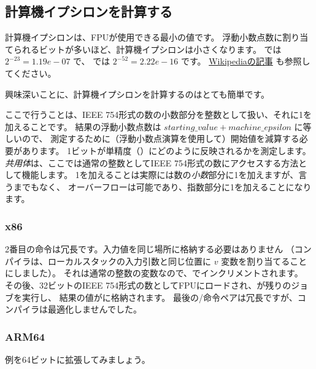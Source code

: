 ﻿\subsection{計算機イプシロンを計算する}

計算機イプシロンは、\ac{FPU}が使用できる最小の値です。 
浮動小数点数に割り当てられるビットが多いほど、計算機イプシロンは小さくなります。
\Tfloat では $2^{-23} = 1.19e-07$ で、 \Tdouble では $2^{-52} = 2.22e-16$ です。
\href{http://link.yurichev.com/17367}{Wikipediaの記事} も参照してください。

興味深いことに、計算機イプシロンを計算するのはとても簡単です。



ここで行うことは、IEEE 754形式の数の小数部分を整数として扱い、それに1を加えることです。
結果の浮動小数点数は $starting\_value+machine\_epsilon$ に等しいので、
測定するために（浮動小数点演算を使用して）開始値を減算する必要があります。
1ビットが単精度（\Tfloat）にどのように反映されるかを測定します。
\emph{共用体}は、ここでは通常の整数としてIEEE 754形式の数にアクセスする方法として機能します。 
1を加えることは実際には数の\emph{小数}部分に1を加えますが、言うまでもなく、
オーバーフローは可能であり、指数部分に1を加えることになります。

\subsubsection{x86}



2番目の命令は冗長です。入力値を同じ場所に格納する必要はありません
（コンパイラは、ローカルスタックの入力引数と同じ位置に $v$ 変数を割り当てることにしました）。
それは通常の整数の変数なので、でインクリメントされます。 
その後、32ビットのIEEE 754形式の数としてFPUにロードされ、が残りのジョブを実行し、
結果の値がに格納されます。 
最後の/命令ペアは冗長ですが、コンパイラは最適化しませんでした。

\subsubsection{ARM64}

例を64ビットに拡張してみましょう。



